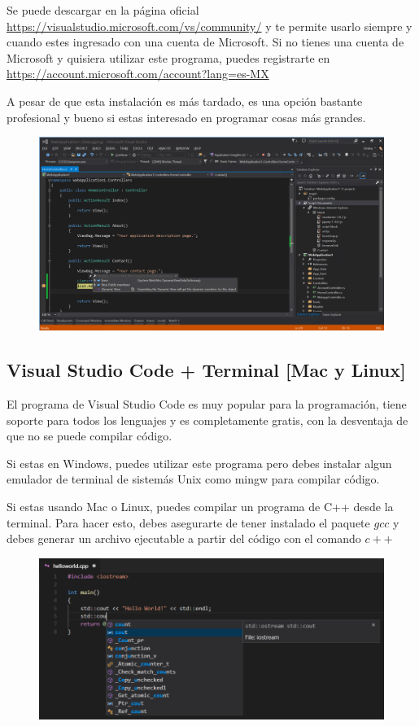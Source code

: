 \documentclass{article}
\begin{document}
Se puede descargar en la página oficial \url{https://visualstudio.microsoft.com/vs/community/} y te permite usarlo siempre y cuando estes ingresado con una cuenta de Microsoft. Si no tienes una cuenta de Microsoft y quisiera utilizar este programa, puedes registrarte en \url{https://account.microsoft.com/account?lang=es-MX}

A pesar de que esta instalación es más tardado, es una opción bastante profesional y bueno si estas interesado en programar cosas más grandes.

\begin{figure}[H]
    \centering
    \includegraphics[width=0.5\paperwidth]{vscommunity}
\end{figure}

\subsection{Visual Studio Code + Terminal [Mac y Linux]}
El programa de Visual Studio Code es muy popular para la programación, tiene soporte para todos los lenguajes y es completamente gratis, con la desventaja de que no se puede compilar código.

Si estas en Windows, puedes utilizar este programa pero debes instalar algun emulador de terminal de sistemás Unix como mingw para compilar código.

Si estas usando Mac o Linux, puedes compilar un programa de C++ desde la terminal. Para hacer esto, debes asegurarte de tener instalado el paquete $gcc$ y debes generar un archivo ejecutable a partir del código con el comando $c++$

\begin{figure}[H]
    \centering
    \includegraphics[width=0.5\paperwidth]{vscode}
\end{figure}
\end{document}
